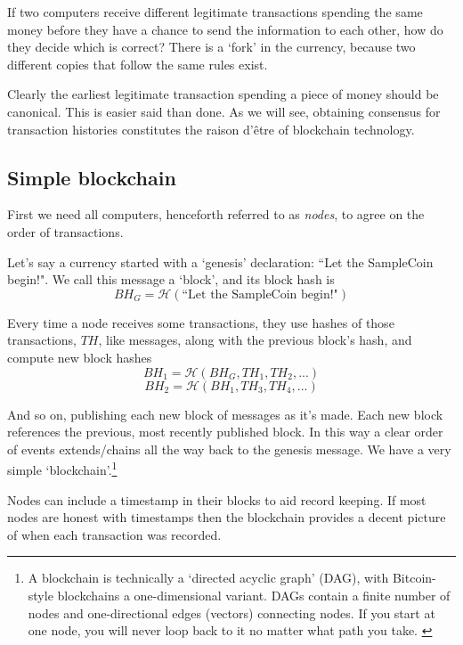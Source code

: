 If two computers receive different legitimate transactions spending the same money before they have a chance to send the information to each other, how do they decide which is correct? There is a `fork' in the currency, because two different copies that follow the same rules exist.

Clearly the earliest legitimate transaction spending a piece of money should be canonical. This is easier said than done. As we will see, obtaining consensus for transaction histories constitutes the raison d'\^{e}tre of blockchain technology.


\subsection{Simple blockchain}
\label{subsec:simple-blockchain}

First we need all computers, henceforth referred to as {\em nodes}, to agree on the order of transactions.

Let's say a currency started with a `genesis' declaration: ``Let the SampleCoin begin!". We call this message a `block', and its block hash is \vspace{.175cm}
\[\mathit{BH}_G = \mathcal{H}(\textrm{``Let the SampleCoin begin!"})\]

Every time a node receives some transactions, they use hashes of those transactions, $\mathit{TH}$, like messages, along with the previous block's hash, and compute new block hashes\vspace{.175cm}
\[\mathit{BH}_1 = \mathcal{H}(\mathit{BH}_G, \mathit{TH}_1, \mathit{TH}_2,...)\]
\[\mathit{BH}_2 = \mathcal{H}(\mathit{BH}_1, \mathit{TH}_3, \mathit{TH}_4,...)\]

And so on, publishing each new block of messages as it's made. Each new block references the previous, most recently published block. In this way a clear order of events extends/chains all the way back to the genesis message. We have a very simple `blockchain'.\footnote{A blockchain is technically a `directed acyclic graph' (DAG), with Bitcoin-style blockchains a one-dimensional variant. DAGs contain a finite number of nodes and one-directional edges (vectors) connecting nodes. If you start at one node, you will never loop back to it no matter what path you take. \cite{DAG-wikipedia}}

Nodes can include a timestamp in their blocks to aid record keeping. If most nodes are honest with timestamps then the blockchain provides a decent picture of when each transaction was recorded.

